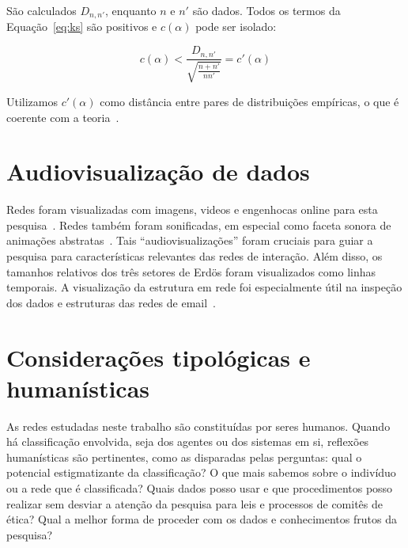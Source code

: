 \documentclass[a4paper,openright,12pt]{report} %
\begin{document}
São calculados $D_{n,n'}$, enquanto $n$ e $n'$ são dados.
Todos os termos da Equação~\ref{eq:ks} são positivos
e $c(\alpha)$ pode ser isolado:

\begin{equation}\label{eq:ks2}
c(\alpha) < \frac{D_{n,n'}}{\sqrt{\frac{n+n'}{nn'}}} = c'(\alpha)
\end{equation}

Utilizamos $c'(\alpha)$
como distância entre pares de distribuições empíricas,
o que é coerente com a teoria~\cite{wpKol}.




\section{Audiovisualização de dados}\label{sec:aud}
Redes foram visualizadas com imagens, videos e engenhocas online para esta pesquisa~\cite{animacoes,galGMANE,appGMANE}.
Redes também foram sonificadas, em especial como faceta sonora de animações abstratas~\cite{preludio,4hubs,gmanePack,social}.
Tais ``audiovisualizações'' foram cruciais para guiar a pesquisa para
características relevantes das redes de interação.
Além disso, os tamanhos relativos dos três setores de Erdös foram visualizados como linhas temporais.
A visualização da estrutura em rede foi especialmente útil na inspeção
dos dados e estruturas das redes de email~\cite{animacoes}.

\section{Considerações tipológicas e humanísticas}\label{sec:tip}
As redes estudadas neste trabalho são constituídas por seres humanos.
Quando há classificação envolvida, seja dos agentes
ou dos sistemas em si, reflexões humanísticas são pertinentes,
como as disparadas pelas perguntas:
    qual o potencial estigmatizante da classificação?
    O que mais sabemos sobre o indivíduo ou a rede que é classificada?
    Quais dados posso usar e que procedimentos posso realizar
	    sem desviar a atenção da pesquisa para leis e processos de comitês de ética?
    Qual a melhor forma de proceder com os dados e conhecimentos frutos da pesquisa?
\end{document}
